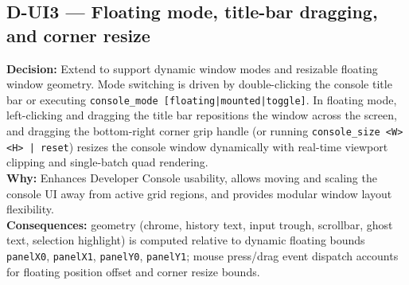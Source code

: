 \subsection*{D-UI3 --- Floating mode, title-bar dragging, and corner resize}
\begin{decisionbox}[title={D-UI3 \quad 2026-08-06}]
\textbf{Decision:} Extend  to support dynamic window modes and resizable floating window geometry. Mode switching is driven by double-clicking the console title bar or executing \texttt{console\_mode [floating|mounted|toggle]}. In floating mode, left-clicking and dragging the title bar repositions the window across the screen, and dragging the bottom-right corner grip handle (or running \texttt{console\_size <W> <H> | reset}) resizes the console window dynamically with real-time viewport clipping and single-batch quad rendering.\\
\textbf{Why:} Enhances Developer Console usability, allows moving and scaling the console UI away from active grid regions, and provides modular window layout flexibility.\\
\textbf{Consequences:}  geometry (chrome, history text, input trough, scrollbar, ghost text, selection highlight) is computed relative to dynamic floating bounds \texttt{panelX0}, \texttt{panelX1}, \texttt{panelY0}, \texttt{panelY1}; mouse press/drag event dispatch accounts for floating position offset and corner resize bounds.
\end{decisionbox}

